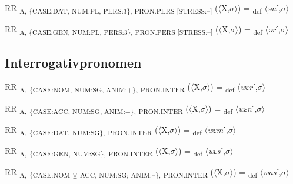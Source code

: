 {\begin{exe}
 RR \textsubscript{A, \{CASE:DAT, NUM:PL, PERS:3\}, PRON.PERS [STRESS:–]} ($\langle$X,$\sigma $$\rangle$) = \textsubscript{def} $\langle$\textit{ən}ˊ,$\sigma $$\rangle$
\end{exe}

\begin{exe}
 RR \textsubscript{A, \{CASE:GEN, NUM:PL, PERS:3\}, PRON.PERS [STRESS:–]} ($\langle$X,$\sigma $$\rangle$) = \textsubscript{def} $\langle$\textit{ər}ˊ,$\sigma $$\rangle$
\end{exe}


\subsection{Interrogativpronomen}

\begin{exe}
 RR \textsubscript{A,} \textsubscript{\{CASE:NOM, NUM:SG, ANIM:+\},} \textsubscript{PRON.INTER} ($\langle$X,$\sigma $$\rangle$) = \textsubscript{def} $\langle$\textit{wɛr}ˊ,$\sigma $$\rangle$
\end{exe}

\begin{exe}
 RR \textsubscript{A,} \textsubscript{\{CASE:ACC, NUM:SG, ANIM:+\},} \textsubscript{PRON.INTER} ($\langle$X,$\sigma $$\rangle$) = \textsubscript{def} $\langle$\textit{wɛn}ˊ,$\sigma $$\rangle$
\end{exe}

\begin{exe}
 RR \textsubscript{A,} \textsubscript{\{CASE:DAT, NUM:SG\},} \textsubscript{PRON.INTER} ($\langle$X,$\sigma $$\rangle$) = \textsubscript{def} $\langle$\textit{wɛm}ˊ,$\sigma $$\rangle$
\end{exe}

\begin{exe}
 RR \textsubscript{A,} \textsubscript{\{CASE:GEN, NUM:SG\},} \textsubscript{PRON.INTER} ($\langle$X,$\sigma $$\rangle$) = \textsubscript{def} $\langle$\textit{wɛs}ˊ,$\sigma $$\rangle$
\end{exe}

\begin{exe}
 RR \textsubscript{A,} \textsubscript{\{CASE:NOM} \textsubscript{${\veebar}$}\textsubscript{ ACC, NUM:SG; ANIM:–\},} \textsubscript{PRON.INTER} ($\langle$X,$\sigma $$\rangle$) = \textsubscript{def} $\langle$\textit{was}ˊ,$\sigma $$\rangle$
\end{exe}

}
